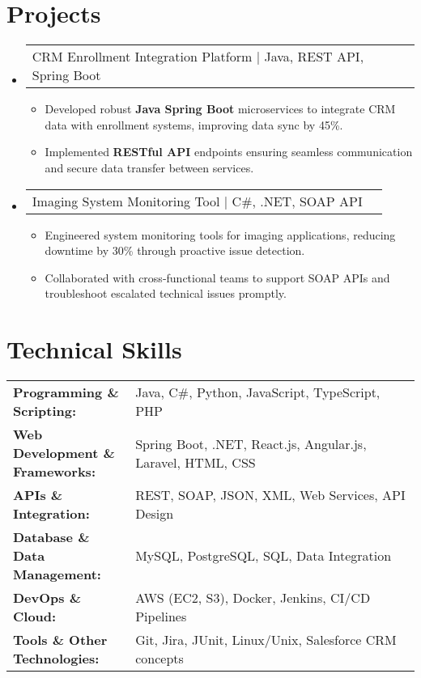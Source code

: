 \documentclass[letterpaper,11pt]{article}
\makeatletter
\newcommand{\resumeItem}[1]{
  \item\footnotesize{
    {#1 \vspace{-2pt}}
  }
}
\newcommand{\resumeProjectHeading}[2]{
    \item
    \begin{tabular*}{1.001\textwidth}{l@{\extracolsep{\fill}}r}
      \small#1 & \textbf{\small #2}\\
    \end{tabular*}\vspace{-7pt}
}
\newcommand{\resumeSubHeadingListStart}{\begin{itemize}[leftmargin=0pt, label={}]}
\newcommand{\resumeSubHeadingListEnd}{\end{itemize}}
\newcommand{\resumeItemListStart}{\begin{itemize}[leftmargin=*]}
\newcommand{\resumeItemListEnd}{\end{itemize}\vspace{-5pt}}
\makeatother
\begin{document}
\section{Projects}
    \vspace{-5pt}
    \resumeSubHeadingListStart
      \resumeProjectHeading
          {CRM Enrollment Integration Platform | Java, REST API, Spring Boot}
          {}
          \resumeItemListStart
              \resumeItem{Developed robust \textbf{Java Spring Boot} microservices to integrate CRM data with enrollment systems, improving data sync by 45\%.}
              \resumeItem{Implemented \textbf{RESTful API} endpoints ensuring seamless communication and secure data transfer between services.}
          \resumeItemListEnd
          \vspace{-16pt}
      \resumeProjectHeading
          {Imaging System Monitoring Tool | C\#, .NET, SOAP API}
          {}
          \resumeItemListStart
              \resumeItem{Engineered system monitoring tools for imaging applications, reducing downtime by 30\% through proactive issue detection.}
              \resumeItem{Collaborated with cross-functional teams to support SOAP APIs and troubleshoot escalated technical issues promptly.}
          \resumeItemListEnd
    \resumeSubHeadingListEnd
\vspace{-10pt}
\section{Technical Skills}
        \vspace{-14pt}
        \begin{table}[h]
            \footnotesize
            \begin{tabular}{p{0.3\linewidth} p{0.7\linewidth}}
                \textbf{Programming \& Scripting:} & Java, C\#, Python, JavaScript, TypeScript, PHP \\
                \textbf{Web Development \& Frameworks:} & Spring Boot, .NET, React.js, Angular.js, Laravel, HTML, CSS \\
                \textbf{APIs \& Integration:} & REST, SOAP, JSON, XML, Web Services, API Design \\
                \textbf{Database \& Data Management:} & MySQL, PostgreSQL, SQL, Data Integration \\
                \textbf{DevOps \& Cloud:} & AWS (EC2, S3), Docker, Jenkins, CI/CD Pipelines \\
                \textbf{Tools \& Other Technologies:} & Git, Jira, JUnit, Linux/Unix, Salesforce CRM concepts \\
            \end{tabular}
        \end{table}
\end{document}

